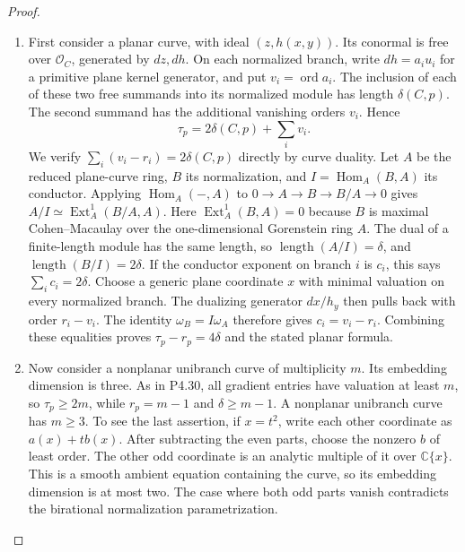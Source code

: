 \begin{proof}
\begin{enumerate}[label={$\langle1\rangle$\arabic*.},leftmargin=*]
\item First consider a planar curve, with ideal $(z,h(x,y))$.
Its conormal is free over $\mathcal O_C$, generated by
$dz,dh$. On each normalized branch, write
$dh=a_i u_i$ for a primitive plane kernel generator,
and put $v_i=\operatorname{ord}a_i$.
The inclusion of each of these two free summands into
its normalized module has length $\delta(C,p)$.
The second summand has the additional vanishing orders
$v_i$. Hence
\[
 \tau_p=2\delta(C,p)+\sum_i v_i.
\]
We verify $\sum_i(v_i-r_i)=2\delta(C,p)$ directly by
curve duality. Let $A$ be the reduced plane-curve ring,
$B$ its normalization, and $I=\operatorname{Hom}_A(B,A)$
its conductor. Applying $\operatorname{Hom}_A(-,A)$ to
$0\to A\to B\to B/A\to0$ gives
$A/I\simeq\operatorname{Ext}^1_A(B/A,A)$.
Here $\operatorname{Ext}^1_A(B,A)=0$ because $B$ is
maximal Cohen--Macaulay over the one-dimensional
Gorenstein ring $A$. The dual of a finite-length module
has the same length, so $\operatorname{length}(A/I)=\delta$,
and $\operatorname{length}(B/I)=2\delta$.
If the conductor exponent on branch $i$ is $c_i$,
this says $\sum_i c_i=2\delta$.
Choose a generic plane coordinate $x$ with minimal
valuation on every normalized branch. The dualizing
generator $dx/h_y$ then pulls back with
order $r_i-v_i$. The identity
$\omega_B=I\omega_A$ therefore gives
$c_i=v_i-r_i$. Combining these equalities proves
$\tau_p-r_p=4\delta$ and the stated planar formula.

\item Now consider a nonplanar unibranch curve of multiplicity
$m$. Its embedding dimension is three. As in P4.30,
all gradient entries have valuation at least $m$, so
$\tau_p\ge2m$, while $r_p=m-1$ and
$\delta\ge m-1$. A nonplanar unibranch curve has
$m\ge3$. To see the last assertion, if $x=t^2$, write
each other coordinate as $a(x)+t b(x)$. After subtracting
the even parts, choose the nonzero $b$ of least order.
The other odd coordinate is an analytic multiple of it
over $\mathbb C\{x\}$. This is a smooth ambient equation
containing the curve, so its embedding dimension is at
most two. The case where both odd parts vanish contradicts
the birational normalization parametrization.


\end{enumerate}
\end{proof}

